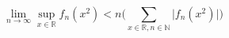 \documentclass{article}
\begin{document}
\[
  \lim_{n\to\infty} \sup_{x\in\mathds{R}} f_n(x^2)
    < n \Big(\sum_{x\in\mathds{R}, n\in\mathds{N}}
    \big| f_n(x^2) \big| \Big)
\]
\end{document}
